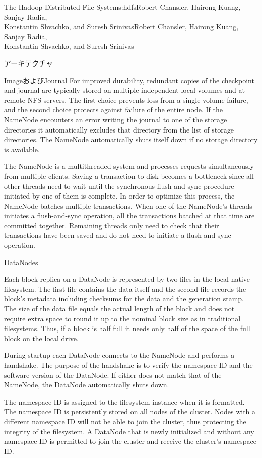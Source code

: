 \begin{aosachaptertoc}{The Hadoop Distributed File System}{s:hdfs}{Robert Chansler, Hairong Kuang, Sanjay Radia, \\ Konstantin Shvachko, and Suresh Srinivas}{Robert Chansler, Hairong Kuang, Sanjay Radia, \\ \hspace*{0.9cm} Konstantin Shvachko, and Suresh Srinivas}
\begin{aosasect1}{アーキテクチャ}
\begin{aosasect2}{ImageおよびJournal}
For improved durability, redundant copies of the checkpoint and
journal are typically stored on multiple independent local volumes and
at remote NFS servers. The first choice prevents loss from a single
volume failure, and the second choice protects against failure of the
entire node. If the NameNode encounters an error writing the journal
to one of the storage directories it automatically excludes that
directory from the list of storage directories. The NameNode
automatically shuts itself down if no storage directory is available.

The NameNode is a multithreaded system and processes requests
simultaneously from multiple clients. Saving a transaction to disk
becomes a bottleneck since all other threads need to wait until the
synchronous flush-and-sync procedure initiated by one of them is
complete.  In order to optimize this process, the NameNode batches
multiple transactions. When one of the NameNode's threads initiates a
flush-and-sync operation, all the transactions batched at that time
are committed together. Remaining threads only need to check that
their transactions have been saved and do not need to initiate a
flush-and-sync operation.

\end{aosasect2}

\begin{aosasect2}{DataNodes}

Each block replica on a DataNode is represented by two files in the
local native filesystem. The first file contains the data itself and
the second file records the block's metadata including checksums for
the data and the generation stamp. The size of the data file equals
the actual length of the block and does not require extra space to
round it up to the nominal block size as in traditional
filesystems. Thus, if a block is half full it needs only half of the
space of the full block on the local drive.

During startup each DataNode connects to the NameNode and performs a
handshake. The purpose of the handshake is to verify the namespace ID
and the software version of the DataNode. If either does not match
that of the NameNode, the DataNode automatically shuts down.

The namespace ID is assigned to the filesystem instance when it is
formatted. The namespace ID is persistently stored on all nodes of the
cluster. Nodes with a different namespace ID will not be able to join
the cluster, thus protecting the integrity of the filesystem. A
DataNode that is newly initialized and without any namespace ID is
permitted to join the cluster and receive the cluster's namespace ID.


\end{aosasect2}
\end{aosasect1}
\end{aosachaptertoc}
